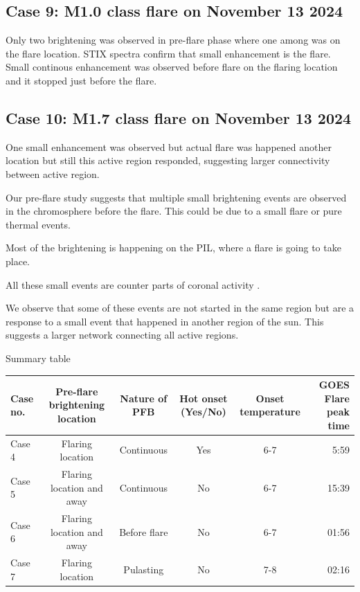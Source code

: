 \documentclass[fleqn,usenatbib]{mnras}
\begin{document}
\subsection{Case 9: M1.0 class flare on November 13 2024}
Only two brightening was observed in pre-flare phase where one among was on the flare location.
STIX spectra confirm that small enhancement is the flare.
Small continous enhancement was observed before flare on the flaring location and it stopped just before the flare.



\subsection{Case 10: M1.7 class flare on November 13 2024}
One small enhancement was observed but actual flare was happened another location but still this active region responded, suggesting larger connectivity between active region.



Our pre-flare study suggests that multiple small brightening events are observed in the chromosphere before the flare. This could be due to a small flare or pure thermal events.

Most of the brightening is happening on the PIL, where a flare is going to take place.

All these small events are counter parts of coronal activity .

We observe that some of these events are not started in the same region but are a response to a small event that happened in another region of the sun.
This suggests a larger network connecting all active regions. 

Summary table
\begin{table}
    \centering
    \begin{tabular}[t]{lccccr}
    \hline
     Case no. & Pre-flare brightening location & Nature of PFB & Hot onset (Yes/No) &Onset temperature& GOES Flare peak time\\
     \hline
     Case 4& Flaring location& Continuous & Yes & 6-7& 5:59\\
     Case 5& Flaring location and away & Continuous & No & 6-7& 15:39\\
     Case 6& Flaring location and away & Before flare & No & 6-7&01:56\\
     Case 7& Flaring location & Pulasting & No & 7-8 & 02:16\\

    \hline
    \end{tabular}
\end{table}
\end{document}
